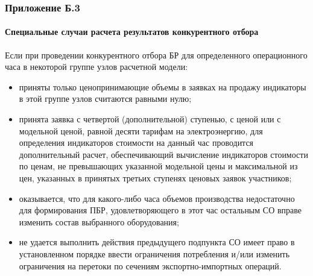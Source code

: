\documentclass[c, dvipsnames]{beamer}  %
\begin{document}
\begin{frame}[shrink=5]
\frametitle{Приложение Б.3} 
\framesubtitle{Специальные случаи расчета результатов конкурентного отбора} 

\footnotesize{
Если при проведении конкурентного отбора БР для определенного операционного часа в некоторой группе узлов расчетной модели:

\begin{itemize}
\item  приняты только ценопринимающие объемы в заявках на продажу индикаторы в этой группе узлов считаются равными нулю;
\item принята заявка с четвертой (дополнительной) ступенью, с ценой или с модельной ценой, равной десяти тарифам на электроэнергию, для определения индикаторов стоимости на данный час проводится дополнительный расчет, обеспечивающий вычисление индикаторов стоимости по ценам, не превышающих указанной модельной цены и максимальной из цен, указанных в принятых третьих ступенях ценовых заявок участников;
\item  оказывается, что для какого-либо часа объемов производства недостаточно для формирования ПБР, удовлетворяющего в этот час остальным СО вправе изменить состав выбранного оборудования;
\item 	 не удается выполнить действия предыдущего подпункта  СО имеет право в установленном порядке ввести ограничения потребления и/или изменить ограничения на перетоки по сечениям экспортно-импортных операций.
\end{itemize}
}

\end{frame}
\end{document}

